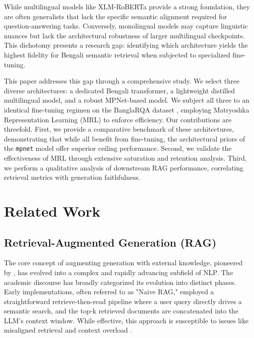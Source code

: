 \documentclass[acmsmall,screen,review]{acmart}
\begin{document}
While multilingual models like XLM-RoBERTa \cite{conneau2019unsupervised} provide a strong foundation, they are often generalists that lack the specific semantic alignment required for question-answering tasks. Conversely, monolingual models may capture linguistic nuances but lack the architectural robustness of larger multilingual checkpoints. This dichotomy presents a research gap: identifying which architecture yields the highest fidelity for Bengali semantic retrieval when subjected to specialized fine-tuning.

This paper addresses this gap through a comprehensive study. We select three diverse architectures: a dedicated Bengali transformer, a lightweight distilled multilingual model, and a robust MPNet-based model. We subject all three to an identical fine-tuning regimen on the BanglaRQA dataset \cite{ekram2022banglarqa}, employing Matryoshka Representation Learning (MRL) \cite{kusupati2022matryoshka} to enforce efficiency. Our contributions are threefold. First, we provide a comparative benchmark of these architectures, demonstrating that while all benefit from fine-tuning, the architectural priors of the \texttt{mpnet} model offer superior ceiling performance. Second, we validate the effectiveness of MRL through extensive saturation and retention analysis. Third, we perform a qualitative analysis of downstream RAG performance, correlating retrieval metrics with generation faithfulness.

\section{Related Work}

\subsection{Retrieval-Augmented Generation (RAG)}
The core concept of augmenting generation with external knowledge, pioneered by \cite{lewis2020retrieval}, has evolved into a complex and rapidly advancing subfield of NLP. The academic discourse has broadly categorized its evolution into distinct phases. Early implementations, often referred to as "Naive RAG," employed a straightforward retrieve-then-read pipeline where a user query directly drives a semantic search, and the top-k retrieved documents are concatenated into the LLM's context window. While effective, this approach is susceptible to issues like misaligned retrieval and context overload \cite{hu2024comprehensive}.
\end{document}
